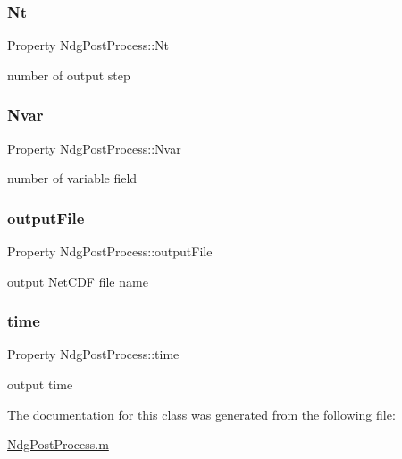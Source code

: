 \subsubsection{\texorpdfstring{Nt}{Nt}}
{\footnotesize\ttfamily Property Ndg\+Post\+Process\+::\+Nt}



number of output step 

\mbox{\label{class_ndg_post_process_af2926f8de2e1452109e8e56f15349e75}} 
\subsubsection{\texorpdfstring{Nvar}{Nvar}}
{\footnotesize\ttfamily Property Ndg\+Post\+Process\+::\+Nvar}



number of variable field 

\mbox{\label{class_ndg_post_process_a08853dfa054b39523a379ab3817e648d}} 
\subsubsection{\texorpdfstring{output\+File}{outputFile}}
{\footnotesize\ttfamily Property Ndg\+Post\+Process\+::output\+File}



output Net\+C\+DF file name 

\mbox{\label{class_ndg_post_process_a11744c856df74639604e7c8e0761fdd7}} 
\subsubsection{\texorpdfstring{time}{time}}
{\footnotesize\ttfamily Property Ndg\+Post\+Process\+::time}



output time 



The documentation for this class was generated from the following file\+:\begin{DoxyCompactItemize}
\item 
\hyperlink{_ndg_post_process_8m}{Ndg\+Post\+Process.\+m}\end{DoxyCompactItemize}
